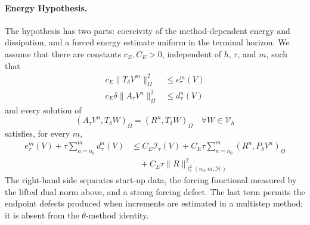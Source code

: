 \documentclass[11pt]{article}
\begin{document}
\paragraph{Energy Hypothesis.}
The hypothesis has two parts: coercivity of the method-dependent energy and
dissipation, and a forced energy estimate uniform in the terminal horizon. We
assume that there are constants \(c_E,C_E>0\), independent of \(h\), \(\tau\),
and \(m\), such that
\begin{align}
c_E\|T_{\delta}V^m\|_{\Omega}^2
&\le e_{\tau}^m(V) \label{eq:energy-coercivity}\\
c_E\delta\|A_{\tau}V^n\|_{\Omega}^2
&\le d_{\tau}^n(V) \label{eq:dissipation-coercivity}
\end{align}
and every solution of
\begin{equation}
(A_{\tau}V^n,T_{\delta}W)_{\Omega}
=(R^n,T_{\delta}W)_{\Omega}
\quad \forall W\in\mathcal V_h \label{eq:abstract-forced-equation}
\end{equation}
satisfies, for every \(m\),
\begin{align}
e_{\tau}^m(V)+\tau\sum_{n=n_0}^{m}d_{\tau}^n(V)
&\le C_E\mathcal I_{\tau}(V)
+C_E\tau\sum_{n=n_0}^{m}(R^n,P_{\delta}V^n)_{\Omega} \label{eq:abstract-energy-hypothesis-main}\\
&\quad+C_E\tau\|R\|_{\ell_{\tau}^2(n_0,m;\mathcal H)}^2 \label{eq:abstract-energy-hypothesis-defect}
\end{align}
The right-hand side separates start-up data, the forcing functional measured
by the lifted dual norm above, and a strong forcing defect. The last term
permits the endpoint defects produced when increments are estimated in a
multistep method; it is absent from the \(\theta\)-method identity.
\end{document}
